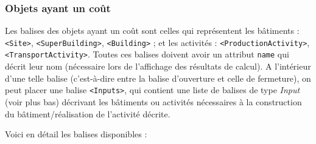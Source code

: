 \documentclass{article}
\begin{document}
\subsubsection{Objets ayant un coût}
Les balises des objets ayant un coût sont celles qui représentent les bâtiments : \texttt{<Site>}, \texttt{<SuperBuilding>}, \texttt{<Building>} ; et les activités : \texttt{<ProductionActivity>}, \texttt{<TransportActivity>}. Toutes ces balises doivent avoir un attribut \texttt{name} qui décrit leur nom (nécessaire lors de l'affichage des résultats de calcul). A l'intérieur d'une telle balise (c'est-à-dire entre la balise d'ouverture et celle de fermeture), on peut placer une balise \texttt{<Inputs>}, qui contient une liste de balises de type \textit{Input} (voir plus bas) décrivant les bâtiments ou activités nécessaires à la construction du bâtiment/réalisation de l'activité décrite.

Voici en détail les balises disponibles :
\end{document}
